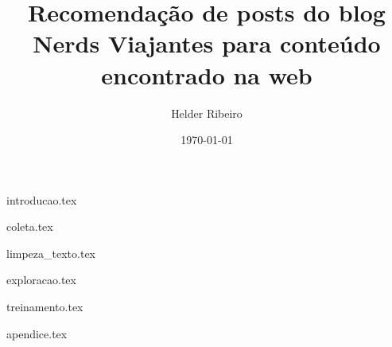 \documentclass{article}
\title{Recomendação de posts do blog Nerds Viajantes para conteúdo encontrado na web}
\author{Helder Ribeiro}
\date{\today}
\begin{document}

\maketitle

\pagebreak

\tableofcontents{}

{introducao.tex}

{coleta.tex}

{limpeza_texto.tex}

{exploracao.tex}

{treinamento.tex}









{apendice.tex}
\end{document}

